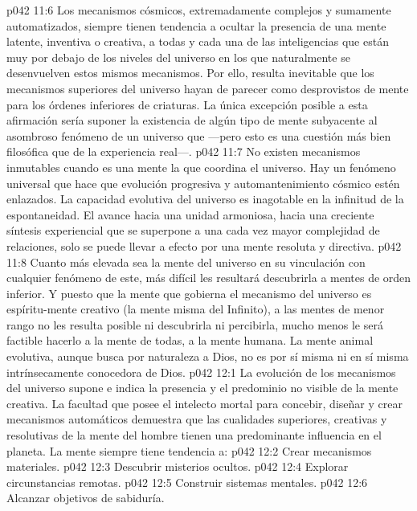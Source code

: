 \vs p042 11:6 \pc Los mecanismos cósmicos, extremadamente complejos y sumamente automatizados, siempre tienen tendencia a ocultar la presencia de una mente latente, inventiva o creativa, a todas y cada una de las inteligencias que están muy por debajo de los niveles del universo en los que naturalmente se desenvuelven estos mismos mecanismos. Por ello, resulta inevitable que los mecanismos superiores del universo hayan de parecer como desprovistos de mente para los órdenes inferiores de criaturas. La única excepción posible a esta afirmación sería suponer la existencia de algún tipo de mente subyacente al asombroso fenómeno de un universo que  ---pero esto es una cuestión más bien filosófica que de la experiencia real---.
\vs p042 11:7 No existen mecanismos inmutables cuando es una mente la que coordina el universo. Hay un fenómeno universal que hace que evolución progresiva y automantenimiento cósmico estén enlazados. La capacidad evolutiva del universo es inagotable en la infinitud de la espontaneidad. El avance hacia una unidad armoniosa, hacia una creciente síntesis experiencial que se superpone a una cada vez mayor complejidad de relaciones, solo se puede llevar a efecto por una mente resoluta y directiva.
\vs p042 11:8 Cuanto más elevada sea la mente del universo en su vinculación con cualquier fenómeno de este, más difícil les resultará descubrirla a mentes de orden inferior. Y puesto que la mente que gobierna el mecanismo del universo es espíritu\hyp{}mente creativo (la mente misma del Infinito), a las mentes de menor rango no les resulta posible ni descubrirla ni percibirla, mucho menos le será factible hacerlo a la mente  de todas, a la mente humana. La mente animal evolutiva, aunque busca por naturaleza a Dios, no es por sí misma ni en sí misma intrínsecamente conocedora de Dios.
\vs p042 12:1 La evolución de los mecanismos del universo supone e indica la presencia y el predominio no visible de la mente creativa. La facultad que posee el intelecto mortal para concebir, diseñar y crear mecanismos automáticos demuestra que las cualidades superiores, creativas y resolutivas de la mente del hombre tienen una predominante influencia en el planeta. La mente siempre tiene tendencia a:
\vs p042 12:2 Crear mecanismos materiales.
\vs p042 12:3 Descubrir misterios ocultos.
\vs p042 12:4 Explorar circunstancias remotas.
\vs p042 12:5 Construir sistemas mentales.
\vs p042 12:6 Alcanzar objetivos de sabiduría.

